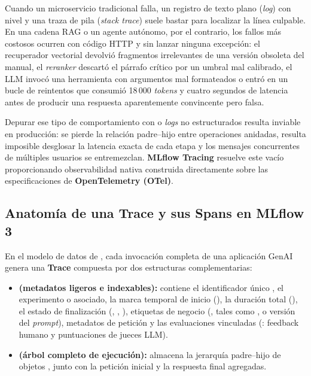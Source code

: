 Cuando un microservicio tradicional falla, un registro de texto plano (\textit{log}) con nivel  y una traza de pila (\textit{stack trace}) suele bastar para localizar la línea culpable. En una cadena RAG o un agente autónomo, por el contrario, los fallos más costosos ocurren con código HTTP  y sin lanzar ninguna excepción: el recuperador vectorial devolvió fragmentos irrelevantes de una versión obsoleta del manual, el \textit{reranker} descartó el párrafo crítico por un umbral mal calibrado, el LLM invocó una herramienta con argumentos mal formateados o entró en un bucle de reintentos que consumió 18\,000 \textit{tokens} y cuatro segundos de latencia antes de producir una respuesta aparentemente convincente pero falsa.

Depurar ese tipo de comportamiento con  o \textit{logs} no estructurados resulta inviable en producción: se pierde la relación padre--hijo entre operaciones anidadas, resulta imposible desglosar la latencia exacta de cada etapa y los mensajes concurrentes de múltiples usuarios se entremezclan. \textbf{MLflow Tracing} resuelve este vacío proporcionando observabilidad nativa construida directamente sobre las especificaciones de \textbf{OpenTelemetry (OTel)}.

\subsection{Anatomía de una Trace y sus Spans en MLflow 3}\label{subsec:anatomia-trace}

En el modelo de datos de , cada invocación completa de una aplicación GenAI genera una \textbf{Trace} compuesta por dos estructuras complementarias:

\begin{itemize}
  \item \textbf{ (metadatos ligeros e indexables):} contiene el identificador único , el experimento o  asociado, la marca temporal de inicio (), la duración total (), el estado de finalización (, , ), etiquetas de negocio (, tales como ,  o versión del \textit{prompt}), metadatos de petición y las evaluaciones vinculadas (: feedback humano y puntuaciones de jueces LLM).
  \item \textbf{ (árbol completo de ejecución):} almacena la jerarquía padre--hijo de objetos \textbf{}, junto con la petición inicial y la respuesta final agregadas.
\end{itemize}

